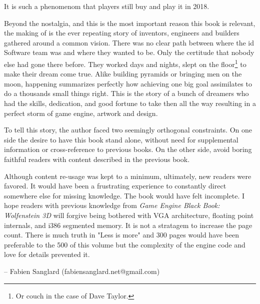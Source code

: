  It is such a phenomenom that players still buy and play it in 2018.\\
 \par

Beyond the nostalgia, and this is the most important reason this book is relevant, the making of \doom is the ever repeating story of inventors, engineers and builders gathered around a common vision. There was no clear path between where the id Software team was and where they wanted to be. Only the certitude that nobody else had gone there before. They worked days and nights, slept on the floor\footnote{Or couch in the case of Dave Taylor.} to make their dream come true. Alike building pyramids or bringing men on the moon, \doom happening summarizes perfectly how achieving one big goal assimilates to do a thousands small things right. This is the story of a bunch of dreamers who had the skills, dedication, and good fortune to take then all the way resulting in a perfect storm of game engine, artwork and design.\\
\par
 To tell this story, the author faced two seemingly orthogonal constraints. On one side the desire to have this book stand alone, without need for supplemental information or cross-reference to previous books. On the other side, avoid boring faithful readers with content described in the previous book.\\
\par
Although content re-usage was kept to a minimum, ultimately, new readers were favored. It would have been a frustrating experience to constantly direct somewhere else for missing knowledge. The book would have felt incomplete. I hope readers with previous knowledge from \textit{Game Engine Black Book: Wolfenstein 3D} will forgive being bothered with VGA architecture, floating point internals, and i386 segmented memory. It is not a stratagem to increase the page count. There is much truth in "Less is more" and 300 pages would have been preferable to the 500 of this volume but the complexity of the engine code and love for details prevented it.\\
\par
-- Fabien Sanglard (fabiensanglard.net@gmail.com)